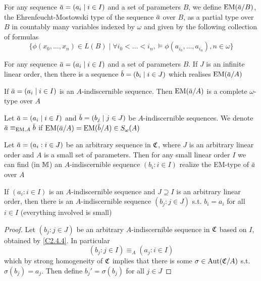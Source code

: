 \documentclass[11pt]{article}
\begin{document}
\begin{definition}[]
For any sequence \(\bara=(a_i\mid i\in I)\) and a set of parameters \(B\), we define \(\EM(\bara/B)\),
the Ehrenfeucht-Mostowski type of the sequence \(\bara\) over \(B\), as a partial type
over \(B\) in countably many variables indexed by \(\omega\) and given by the following collection of
formulas
\begin{equation*}
\{\phi(x_0,\dots,x_n)\in L(B)\mid\forall i_0<\dots<i_n,\vDash\phi(a_{i_0},\dots,a_{i_n}),n\in\omega\}
\end{equation*}
\end{definition}

\begin{exercise}
For any sequence \(\bara=(a_i\mid i\in I)\) and a set of parameters \(B\). If \(J\) is an infinite
linear order, then there is a sequence \(\barb=(b_i\mid i\in J)\) which realises \(\EM(\bara/A)\)
\end{exercise}

\begin{exercise}
If \(\bara=(a_i\mid i\in I)\) is an \(A\)-indiscernible sequence. Then \(\EM(\bara/A)\) is a complete
\(\omega\)-type over \(A\)
\end{exercise}

Let \(\bara=(a_i\mid i\in I)\) and \(\barb=(b_j\mid j\in J)\) be \(A\)-indiscernible sequences. We
denote \(\bara\equiv_{\EM,A}\barb\) if \(\EM(\bara/A)=\EM(\barb/A)\in S_\omega(A)\)

\begin{proposition}[]
\label{C2.4.4}
\label{y4.6}
Let \(\bara=(a_i:i\in J)\) be an arbitrary sequence in \(\mathfrak{C}\), where \(J\) is an arbitrary linear
order and \(A\) is a small set of parameters. Then for any small linear order \(I\) we can find (in \(\mathbb{M}\))
an \(A\)-indiscernible sequence \((b_i:i\in I)\) realize the EM-type of \(\bara\) over \(A\)
\end{proposition}

\begin{corollary}[]
If \((a_i:i\in I)\) is an \(A\)-indiscernible sequence and \(J\supseteq I\) is an arbitrary linear order,
then there is an \(A\)-indiscernible sequence \((b_j:j\in J)\) s.t. \(b_i=a_i\) for all \(i\in I\)
(everything involved is small)
\end{corollary}

\begin{proof}
Let \((b_j:j\in J)\) be an arbitrary \(A\)-indiscernible sequence in \(\mathfrak{C}\) based on \(I\),
obtained by \ref{C2.4.4}. In particular
\begin{equation*}
(b_j:j\in I)\equiv_A(a_j:i\in I)
\end{equation*}
which by strong homogeneity of \(\mathfrak{C}\) implies that there is some \(\sigma\in\operatorname{\text{Aut}}(\mathfrak{C}/A)\)
s.t. \(\sigma(b_j)=a_j\). Then define \(b_j'=\sigma(b_j)\) for all \(j\in J\)
\end{proof}
\end{document}
